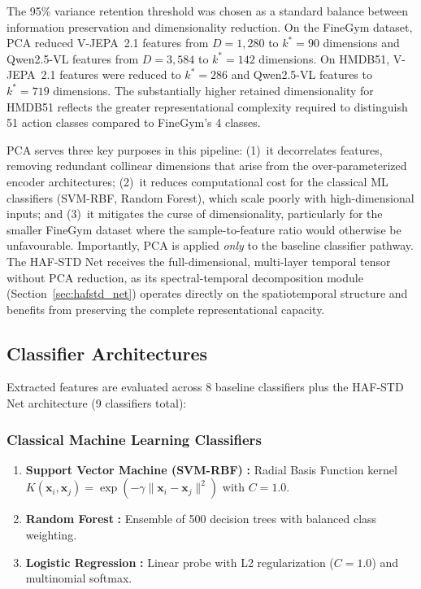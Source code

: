 The 95\% variance retention threshold was chosen as a standard balance between information preservation and dimensionality reduction. On the FineGym dataset, PCA reduced V-JEPA~2.1 features from $D=1{,}280$ to $k^*=90$ dimensions and Qwen2.5-VL features from $D=3{,}584$ to $k^*=142$ dimensions. On HMDB51, V-JEPA~2.1 features were reduced to $k^*=286$ and Qwen2.5-VL features to $k^*=719$ dimensions. The substantially higher retained dimensionality for HMDB51 reflects the greater representational complexity required to distinguish 51 action classes compared to FineGym's 4 classes.

PCA serves three key purposes in this pipeline: (1)~it decorrelates features, removing redundant collinear dimensions that arise from the over-parameterized encoder architectures; (2)~it reduces computational cost for the classical ML classifiers (SVM-RBF, Random Forest), which scale poorly with high-dimensional inputs; and (3)~it mitigates the curse of dimensionality, particularly for the smaller FineGym dataset where the sample-to-feature ratio would otherwise be unfavourable. Importantly, PCA is applied \textit{only} to the baseline classifier pathway. The HAF-STD Net receives the full-dimensional, multi-layer temporal tensor without PCA reduction, as its spectral-temporal decomposition module (Section~\ref{sec:hafstd_net}) operates directly on the spatiotemporal structure and benefits from preserving the complete representational capacity.


\subsection{Classifier Architectures}

Extracted features are evaluated across 8 baseline classifiers plus the HAF-STD Net architecture (9 classifiers total):

\subsubsection{Classical Machine Learning Classifiers}

\begin{enumerate}[leftmargin=*]
    \item \textbf{Support Vector Machine (SVM-RBF)} \citep{cortes1995svm}\textbf{:} Radial Basis Function kernel $K(\mathbf{x}_i, \mathbf{x}_j) = \exp\left(-\gamma \|\mathbf{x}_i - \mathbf{x}_j\|^2\right)$ with $C=1.0$.
    \item \textbf{Random Forest} \citep{breiman2001randomforests}\textbf{:} Ensemble of 500 decision trees with balanced class weighting.
    \item \textbf{Logistic Regression} \citep{cox1958logistic}\textbf{:} Linear probe with L2 regularization ($C=1.0$) and multinomial softmax.
\end{enumerate}

